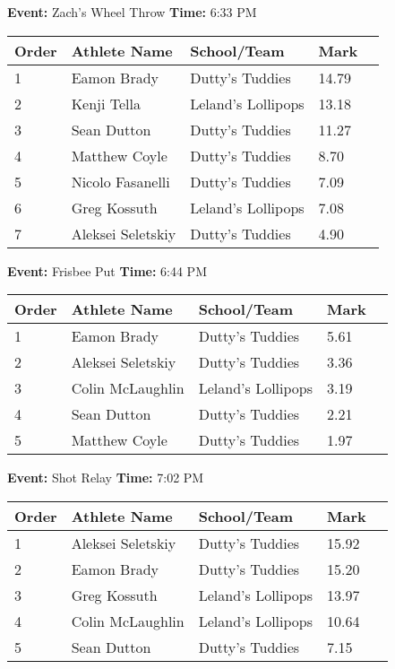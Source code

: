 \documentclass[11pt]{article}
\begin{document}
\textbf{Event:} Zach's Wheel Throw \quad \textbf{Time:} 6:33 PM 

\vspace{1em}
\begin{tabular}{@{}lllll@{}}
\toprule

\textbf{Order} & \textbf{Athlete Name} & \textbf{School/Team} & \textbf{Mark} \\
\midrule
1 & Eamon Brady & Dutty's Tuddies & 14.79 &\\
2 & Kenji Tella & Leland's Lollipops & 13.18 &\\
3 & Sean Dutton & Dutty's Tuddies & 11.27 &\\
4 & Matthew Coyle & Dutty's Tuddies & 8.70 &\\
5 & Nicolo Fasanelli & Dutty's Tuddies & 7.09 &\\
6 & Greg Kossuth & Leland's Lollipops & 7.08 &\\
7 & Aleksei Seletskiy & Dutty's Tuddies & 4.90 &\\
\bottomrule
\end{tabular}
\vspace{2.5em}


\textbf{Event:} Frisbee Put \quad \textbf{Time:} 6:44 PM 

\vspace{1em}
\begin{tabular}{@{}lllll@{}}
\toprule

\textbf{Order} & \textbf{Athlete Name} & \textbf{School/Team} & \textbf{Mark} \\
\midrule
1 & Eamon Brady & Dutty's Tuddies & 5.61 &\\
2 & Aleksei Seletskiy & Dutty's Tuddies & 3.36 &\\
3 & Colin McLaughlin & Leland's Lollipops & 3.19 &\\
4 & Sean Dutton & Dutty's Tuddies & 2.21 &\\
5 & Matthew Coyle & Dutty's Tuddies & 1.97 &\\
\bottomrule
\end{tabular}
\vspace{2.5em}


\textbf{Event:} Shot Relay \quad \textbf{Time:} 7:02 PM 

\vspace{1em}
\begin{tabular}{@{}lllll@{}}
\toprule

\textbf{Order} & \textbf{Athlete Name} & \textbf{School/Team} & \textbf{Mark} \\
\midrule
1 & Aleksei Seletskiy & Dutty's Tuddies & 15.92 &\\
2 & Eamon Brady & Dutty's Tuddies & 15.20 &\\
3 & Greg Kossuth & Leland's Lollipops & 13.97 &\\
4 & Colin McLaughlin & Leland's Lollipops & 10.64 &\\
5 & Sean Dutton & Dutty's Tuddies & 7.15 &\\
\bottomrule
\end{tabular}
\vspace{2.5em}
\end{document}
